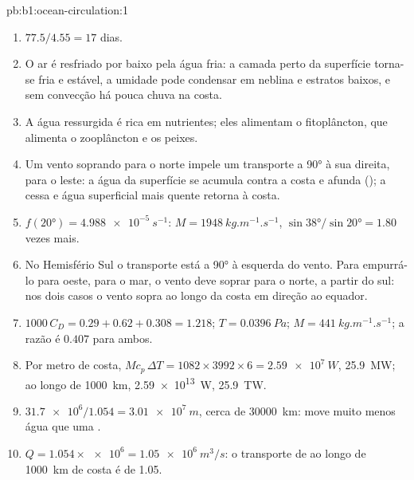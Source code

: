 \begin{solution}{pb:b1:ocean-circulation:1}
\begin{enumerate}
  \item $77.5/4.55 = 17$ dias.
  \item O ar é resfriado por baixo pela água fria: a camada perto da superfície
        torna-se fria e estável, a umidade pode condensar em neblina e estratos baixos,
        e sem convecção há pouca chuva na costa.
  \item A água ressurgida é rica em nutrientes; eles alimentam o fitoplâncton, que
        alimenta o zooplâncton e os peixes.
  \item Um vento soprando para o norte impele um transporte a \ang{90} à sua direita, para o
        leste: a água da superfície se acumula contra a costa e afunda (); a
         cessa e água superficial mais quente retorna à costa.
  \item $f(\ang{20}) = \qty{4.988e-5}{s^{-1}}$: $M = \qty{1948}{kg.m^{-1}.s^{-1}}$,
        $\sin\ang{38}/\sin\ang{20} = 1.80$ vezes mais.
  \item No Hemisfério Sul o transporte está a \ang{90} à esquerda do
        vento. Para empurrá-lo para oeste, para o mar, o vento deve soprar para o norte, a partir do
        sul: nos dois casos o vento sopra ao longo da costa em direção ao equador.
  \item $1000\,C_D = 0.29 + 0.62 + 0.308 = 1.218$; $T = \qty{0.0396}{Pa}$; $M =
        \qty{441}{kg.m^{-1}.s^{-1}}$; a razão é $0.407$ para ambos.
  \item Por metro de costa, $M c_p\,\Delta T = 1082 \times 3992 \times 6 =
        \qty{2.59e7}{W}$, \qty{25.9}{MW}; ao longo de \qty{1000}{km}, \qty{2.59e13}{W},
        \qty{25.9}{TW}.
  \item $\num{31.7e6}/1.054 = \qty{3.01e7}{m}$, cerca de \qty{30000}{km}:  move muito menos água que uma .
  \item $Q = 1.054 \times \num{e6} = \qty{1.05e6}{m^3/s}$: o transporte de 
        ao longo de \qty{1000}{km} de costa é de \qty{1.05}{\sverdrup}.
\end{enumerate}
\end{solution}
